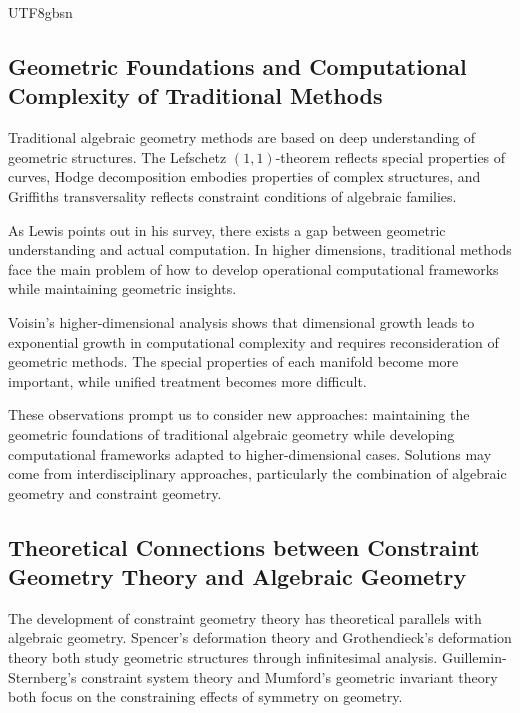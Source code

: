 \documentclass[a4paper,12pt]{extarticle}
\theoremstyle{definition}
\begin{document}
\begin{CJK}{UTF8}{gbsn}
\subsection{Geometric Foundations and Computational Complexity of Traditional Methods}
\label{subsec:geometric_wisdom_computational}

Traditional algebraic geometry methods are based on deep understanding of geometric structures. The Lefschetz $(1,1)$-theorem reflects special properties of curves\cite{lefschetz1924analysis}, Hodge decomposition embodies properties of complex structures\cite{hodge1952harmonic}, and Griffiths transversality reflects constraint conditions of algebraic families\cite{griffiths1968periods}.

As Lewis points out in his survey\cite{lewis1999survey}, there exists a gap between geometric understanding and actual computation. In higher dimensions, traditional methods face the main problem of how to develop operational computational frameworks while maintaining geometric insights.

Voisin's higher-dimensional analysis\cite{voisin2007hodge} shows that dimensional growth leads to exponential growth in computational complexity and requires reconsideration of geometric methods. The special properties of each manifold become more important, while unified treatment becomes more difficult.

These observations prompt us to consider new approaches: maintaining the geometric foundations of traditional algebraic geometry while developing computational frameworks adapted to higher-dimensional cases. Solutions may come from interdisciplinary approaches, particularly the combination of algebraic geometry and constraint geometry.

\subsection{Theoretical Connections between Constraint Geometry Theory and Algebraic Geometry}
\label{subsec:constraint_algebraic_resonance}

The development of constraint geometry theory has theoretical parallels with algebraic geometry. Spencer's deformation theory\cite{spencer1962deformation} and Grothendieck's deformation theory both study geometric structures through infinitesimal analysis. Guillemin-Sternberg's constraint system theory\cite{guillemin1984symplectic} and Mumford's geometric invariant theory\cite{mumford1994geometric} both focus on the constraining effects of symmetry on geometry.


\end{CJK}
\end{document}
